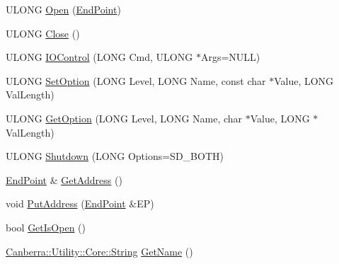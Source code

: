 \begin{DoxyCompactItemize}
\item 
U\+L\+O\+NG \hyperlink{class_canberra_1_1_utility_1_1_network_1_1_socket_a0a1f3b3a4f569a49eacaf41b9f6c4e02_a0a1f3b3a4f569a49eacaf41b9f6c4e02}{Open} (\hyperlink{class_canberra_1_1_utility_1_1_network_1_1_end_point}{End\+Point})
\item 
U\+L\+O\+NG \hyperlink{class_canberra_1_1_utility_1_1_network_1_1_socket_aeeb878451ad2858353a03d7314a9e21a_aeeb878451ad2858353a03d7314a9e21a}{Close} ()
\item 
U\+L\+O\+NG \hyperlink{class_canberra_1_1_utility_1_1_network_1_1_socket_ac0108800fa686483d5920a8b6ec7be61_ac0108800fa686483d5920a8b6ec7be61}{I\+O\+Control} (L\+O\+NG Cmd, U\+L\+O\+NG $\ast$Args=N\+U\+LL)
\item 
U\+L\+O\+NG \hyperlink{class_canberra_1_1_utility_1_1_network_1_1_socket_a5909a3e5b2a91234dd38eed12733b906_a5909a3e5b2a91234dd38eed12733b906}{Set\+Option} (L\+O\+NG Level, L\+O\+NG Name, const char $\ast$Value, L\+O\+NG Val\+Length)
\item 
U\+L\+O\+NG \hyperlink{class_canberra_1_1_utility_1_1_network_1_1_socket_a461a6bdb1f66e4e1630d2d7b8243dc48_a461a6bdb1f66e4e1630d2d7b8243dc48}{Get\+Option} (L\+O\+NG Level, L\+O\+NG Name, char $\ast$Value, L\+O\+NG $\ast$Val\+Length)
\item 
U\+L\+O\+NG \hyperlink{class_canberra_1_1_utility_1_1_network_1_1_socket_a95bcbcc02a2a066c7060d32aa0db24ff_a95bcbcc02a2a066c7060d32aa0db24ff}{Shutdown} (L\+O\+NG Options=S\+D\+\_\+\+B\+O\+TH)
\item 
\hyperlink{class_canberra_1_1_utility_1_1_network_1_1_end_point}{End\+Point} \& \hyperlink{class_canberra_1_1_utility_1_1_network_1_1_socket_ace32db4f002b8c15c5b02ef539393909_ace32db4f002b8c15c5b02ef539393909}{Get\+Address} ()
\item 
void \hyperlink{class_canberra_1_1_utility_1_1_network_1_1_socket_aeb44e9e2651d1285ee544746e46c16b1_aeb44e9e2651d1285ee544746e46c16b1}{Put\+Address} (\hyperlink{class_canberra_1_1_utility_1_1_network_1_1_end_point}{End\+Point} \&EP)
\item 
bool \hyperlink{class_canberra_1_1_utility_1_1_network_1_1_socket_a2e9ac3c2718818efc8a555104af88447_a2e9ac3c2718818efc8a555104af88447}{Get\+Is\+Open} ()
\item 
\hyperlink{class_canberra_1_1_utility_1_1_core_1_1_string}{Canberra\+::\+Utility\+::\+Core\+::\+String} \hyperlink{class_canberra_1_1_utility_1_1_network_1_1_socket_aaa2d5b626ffd5bea01b1b2adb53eb446_aaa2d5b626ffd5bea01b1b2adb53eb446}{Get\+Name} ()

\end{DoxyCompactItemize}

